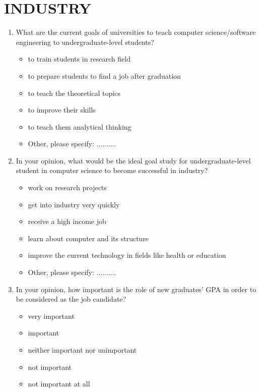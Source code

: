\documentclass[12pt,a4paper,titlepage]{article}
\begin{document}
\section{INDUSTRY}

\begin{enumerate}

	\item What are the current goals of universities to teach computer science/software engineering to undergraduate-level students?
	\begin{itemize}
		\item to train students in research field
		\item to prepare students to find a job after graduation
		\item to teach the theoretical topics
		\item to improve their skills
		\item to teach them analytical thinking
		\item Other, please specify: ..........
	\end{itemize}

	\item In your opinion, what would be the ideal goal study for undergraduate-level student in computer science to become successful in industry?
	\begin{itemize}
		\item work on research projects
		\item get into industry very quickly
		\item receive a high income job
		\item learn about computer and its structure
		\item improve the current technology in fields like health or education
		\item Other, please specify: ..........
	\end{itemize}

	\item In your opinion, how important is the role of new graduates’ GPA in order to be considered as the job candidate?
	\begin{itemize}
		\item very important
		\item important
		\item neither important nor unimportant
		\item not important
		\item not important at all
	\end{itemize} 


\end{enumerate}
\end{document}
